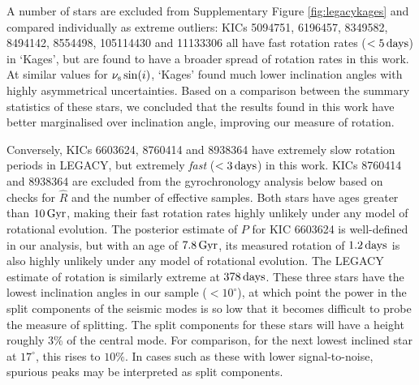 A number of stars are excluded from Supplementary Figure \ref{fig:legacykages} and compared individually as extreme outliers: KICs 5094751, 6196457, 8349582, 8494142, 8554498, 105114430 and 11133306 all have fast rotation rates ($<5\, \rm days$) in `Kages', but are found to have a broader spread of rotation rates in this work. At similar values for $\nu_{\rm s}\sin(i)$, `Kages' found much lower inclination angles with highly asymmetrical uncertainties. Based on a comparison between the summary statistics of these stars, we concluded that the results found in this work have better marginalised over inclination angle, improving our measure of rotation.

Conversely, KICs 6603624, 8760414 and 8938364 have extremely slow rotation periods in LEGACY, but extremely \textit{fast} ($<3\, \rm {days}$) in this work. KICs 8760414 and 8938364 are excluded from the gyrochronology analysis below based on checks for $\hat{R}$ and the number of effective samples. Both stars have ages greater than $10\, \rm Gyr$, making their fast rotation rates highly unlikely under any model of rotational evolution. The posterior estimate of $P$ for KIC 6603624 is well-defined in our analysis, but with an age of $7.8\, \rm Gyr$, its measured rotation of $1.2\, \rm days$ is also highly unlikely under any model of rotational evolution. The LEGACY estimate of rotation is similarly extreme at $378\, \rm days$. These three stars have the lowest inclination angles in our sample ($< 10^\circ$), at which point the power in the split components of the seismic modes is so low that it becomes difficult to probe the measure of splitting. The split components for these stars will have a height roughly 3\% of the central mode. For comparison, for the next lowest inclined star at $17^\circ$, this rises to $10\%$. In cases such as these with lower signal-to-noise, spurious peaks may be interpreted as split components.\\

